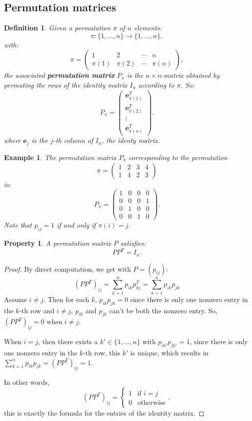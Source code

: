 \documentclass[a4paper,11pt]{report}
\newtheorem{example}[theorem]{Example}
\newtheorem{property}[theorem]{Property}
\newtheorem{definition}[theorem]{Definition}
\begin{document}
\subsection{Permutation matrices}
\begin{definition}\label{petmruation}
  Given a permutation $\pi$ of $n$ elements:
  $$\pi: \{1,\ldots,n\} \to \{1,\ldots,n\},$$
  with:
    $$\pi = \begin{pmatrix} 1 & 2 & \cdots & n \\ \pi(1) & \pi(2) & \cdots & \pi(n) \end{pmatrix}, $$
  the associated \textbf{permutation matrix} $P_\pi$ is the $n\times n$-matrix 
  obtained by permuting the rows of the identity matrix $I_n$ according to $\pi$. 
  So:
 $$P_\pi = \begin{pmatrix} 
\mathbf{e}^T_{\pi(1)}  \\
\mathbf{e}^T_{\pi(2)}  \\
\vdots  \\
\mathbf{e}^T_{\pi(n)}  
\end{pmatrix}.$$
 where $\mathbf{e}_{j}$ is the $j$-th column of $I_n$, the identy matrix.
 \end{definition}
\begin{example}
  The permutation matrix $P_\pi$ corresponding to the permutation  $$\pi = \begin{pmatrix} 1 & 2 & 3 & 4 \\ 1 & 4 & 2 & 3 \end{pmatrix} $$
  is:
  $$P_\pi = \begin{pmatrix} 
1 & 0 & 0 & 0  \\
0 & 0 & 0 & 1  \\
0 & 1 & 0 & 0  \\
0 & 0 & 1 & 0  
\end{pmatrix}.$$
Note that $p_{ij} = 1$ if and only if $\pi(i) = j$. 
\end{example}

\begin{property}\label{permutatie}
A permutation matrix $P$ satisfies:
  $$PP^T = I_n.$$
 
\end{property}
\begin{proof}
By direct computation, we get with $P = (p_{ij})$:
$$(PP^T)_{ij} = \sum^n_{k=1}p_{ik}p^T_{kj} = \sum^n_{k=1}p_{ik}p_{jk}$$
Assume $i \not = j$. Then for each $k$, $p_{ik}p_{jk} = 0$ since there is only
one nonzero entry in the $k$-th row and $i \not = j$, $p_{ik}$ and $p_{jk}$ 
can't be both the nonzero entry. So, $(PP^T)_{ij} = 0$ when $i \not = j$.

When $i=j$, then there exists a $k' \in \{1,\ldots,n\}$ with $p_{ik'}p_{jk'} = 1$, 
since there is only one nonzero entry in the $k$-th row, this $k'$ is unique, 
which results in $\sum^n_{k=1}p_{ik}p_{jk} = (PP^T)_{ij} = 1$.

In other words,
$$(PP^T)_{ij} = \begin{cases} 1 &\mbox{if } i = j \\ 
0 & \mbox{otherwise} \end{cases},$$
this is exactly the formula for the entries of the identity matrix.
\end{proof}
\end{document}
